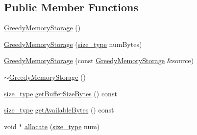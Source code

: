 \subsection*{Public Member Functions}
\begin{DoxyCompactItemize}
\item 
\hyperlink{classuva_1_1smt_1_1tries_1_1alloc_1_1_greedy_memory_storage_ad884058f655d984fd2020d2f78ebfae1}{Greedy\+Memory\+Storage} ()
\item 
\hyperlink{classuva_1_1smt_1_1tries_1_1alloc_1_1_greedy_memory_storage_adf64473bd3554e6a99ee76eaa8f5bb86}{Greedy\+Memory\+Storage} (\hyperlink{classuva_1_1smt_1_1tries_1_1alloc_1_1_greedy_memory_storage_a15b9139bffa854a165a11131725fa903}{size\+\_\+type} num\+Bytes)
\item 
\hyperlink{classuva_1_1smt_1_1tries_1_1alloc_1_1_greedy_memory_storage_a9f6bc53f9409b7e33cbd71b049e84b62}{Greedy\+Memory\+Storage} (const \hyperlink{classuva_1_1smt_1_1tries_1_1alloc_1_1_greedy_memory_storage}{Greedy\+Memory\+Storage} \&source)
\item 
\hyperlink{classuva_1_1smt_1_1tries_1_1alloc_1_1_greedy_memory_storage_a1989fe7f8ce7a1d5a6eb5099a7f758a3}{$\sim$\+Greedy\+Memory\+Storage} ()
\item 
\hyperlink{classuva_1_1smt_1_1tries_1_1alloc_1_1_greedy_memory_storage_a15b9139bffa854a165a11131725fa903}{size\+\_\+type} \hyperlink{classuva_1_1smt_1_1tries_1_1alloc_1_1_greedy_memory_storage_a15e65cfaa69595d51abf6d0218a0b61e}{get\+Buffer\+Size\+Bytes} () const 
\item 
\hyperlink{classuva_1_1smt_1_1tries_1_1alloc_1_1_greedy_memory_storage_a15b9139bffa854a165a11131725fa903}{size\+\_\+type} \hyperlink{classuva_1_1smt_1_1tries_1_1alloc_1_1_greedy_memory_storage_a4f9ace52a4b63a18d93860adf2d227bb}{get\+Available\+Bytes} () const 
\item 
void $\ast$ \hyperlink{classuva_1_1smt_1_1tries_1_1alloc_1_1_greedy_memory_storage_a796730fda3574ac4654bed1e12b1117d}{allocate} (\hyperlink{classuva_1_1smt_1_1tries_1_1alloc_1_1_greedy_memory_storage_a15b9139bffa854a165a11131725fa903}{size\+\_\+type} num)
\end{DoxyCompactItemize}
